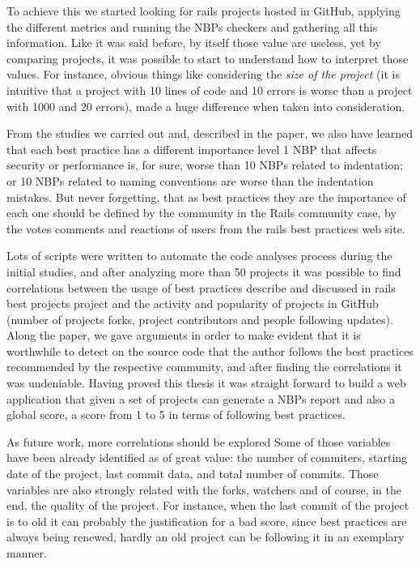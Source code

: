 To achieve this we started looking for rails projects hosted in GitHub, 
applying the different metrics and running the NBPs checkers and gathering all this information.
Like it was said before, by itself those value are useless, yet
by comparing projects, it was possible to start to understand how to interpret those values.
For instance, obvious things like considering the \emph{size of the project}
(it is intuitive that a project with 10 lines of code and 10 errors is worse than a project with 1000 and 20 errors),
made a huge difference when taken into consideration.

From the studies we carried out and, described in the paper,
we also have learned that each best practice has a different importance level
1 NBP that affects security or performance is, for sure, worse than 10 NBPs related to indentation;
or 10 NBPs related to naming conventions are worse than the indentation mistakes.
But never forgetting, that as best practices they are the importance of each one should be defined
by the community in the Rails community case, by the votes comments and reactions of users from
the rails best practices web site.

Lots of scripts were written to automate the code analyses process during the initial studies, 
and after analyzing more than 50 projects it was possible to find correlations
between the usage of best practices describe and discussed in rails best projects project and
the activity and popularity of projects in GitHub (number of projects forks, project contributors and people following updates).
Along the paper, we gave arguments in order to make evident that it is worthwhile to detect on the source code
that the author follows the best practices recommended by the respective community, 
and after finding the correlations it was undeniable.
Having proved this thesis it was straight forward to build a web application that 
given a set of projects can generate a NBPs report and also a global score, 
a score from 1 to 5 in terms of following best practices.

As future work, more correlations should be explored
Some of those variables have been already identified as of great value: the number of commiters, starting date of the project, last commit data, and total number of commits. 
Those variables are also strongly related with the forks, watchers and of course, in the end, the quality of the project.
For instance, when the last commit of the project is to old it can probably the justification for a bad score, 
since best practices are always being renewed, hardly an old project can be following it in an exemplary manner.


